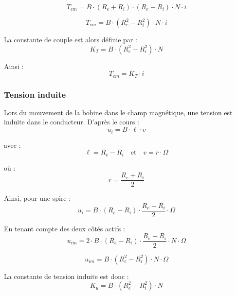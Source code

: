 \begin{equation}
T_{em} = B \cdot (R_e + R_i) \cdot (R_e - R_i) \cdot N \cdot i
\end{equation}

\begin{equation}
T_{em} = B \cdot (R_e^2 - R_i^2) \cdot N \cdot i
\end{equation}

La constante de couple est alors définie par :
\begin{equation}
K_T = B \cdot (R_e^2 - R_i^2) \cdot N
\label{eq:calc_KT}
\end{equation}

Ainsi :
\begin{equation}
T_{em} = K_T \cdot i
\end{equation}

\subsubsection{Tension induite}

Lors du mouvement de la bobine dans le champ magnétique, une tension est induite dans le conducteur. D’après le cours :
\begin{equation}
u_i = B \cdot \ell \cdot v
\end{equation}

avec :
\begin{equation}
\ell = R_e - R_i
\quad \text{et} \quad
v = r \cdot \Omega
\end{equation}

où :
\begin{equation}
r = \frac{R_e + R_i}{2}
\end{equation}

Ainsi, pour une spire :
\begin{equation}
u_i = B \cdot (R_e - R_i) \cdot \frac{R_e + R_i}{2} \cdot \Omega
\end{equation}

En tenant compte des deux côtés actifs :
\begin{equation}
u_{im} = 2 \cdot B \cdot (R_e - R_i) \cdot \frac{R_e + R_i}{2} \cdot N \cdot \Omega
\end{equation}

\begin{equation}
u_{im} = B \cdot (R_e^2 - R_i^2) \cdot N \cdot \Omega
\end{equation}

La constante de tension induite est donc :
\begin{equation}
K_u = B \cdot (R_e^2 - R_i^2) \cdot N
\end{equation}

